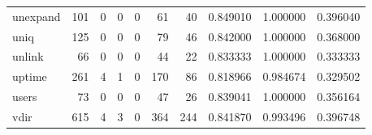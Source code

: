 \begin{tabular}{lrrrrrrrrr}
unexpand  &                                   101 &                                                  0 &                                                  0 &                                                  0 &                                                 61 &                                                 40 &                                           0.849010 &                               1.000000 &                             0.396040 \\
uniq      &                                   125 &                                                  0 &                                                  0 &                                                  0 &                                                 79 &                                                 46 &                                           0.842000 &                               1.000000 &                             0.368000 \\
unlink    &                                    66 &                                                  0 &                                                  0 &                                                  0 &                                                 44 &                                                 22 &                                           0.833333 &                               1.000000 &                             0.333333 \\
uptime    &                                   261 &                                                  4 &                                                  1 &                                                  0 &                                                170 &                                                 86 &                                           0.818966 &                               0.984674 &                             0.329502 \\
users     &                                    73 &                                                  0 &                                                  0 &                                                  0 &                                                 47 &                                                 26 &                                           0.839041 &                               1.000000 &                             0.356164 \\
vdir      &                                   615 &                                                  4 &                                                  3 &                                                  0 &                                                364 &                                                244 &                                           0.841870 &                               0.993496 &                             0.396748 \\

\end{tabular}
